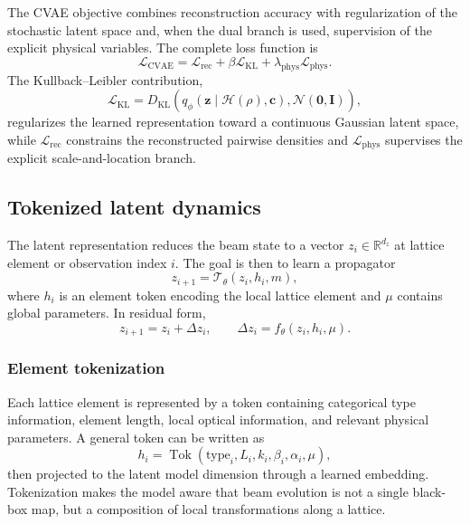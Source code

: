 The CVAE objective combines reconstruction accuracy with regularization of the stochastic latent space and, when the dual branch is used, supervision of the explicit physical variables. The complete loss function is
\[
\mathcal{L}_{\mathrm{CVAE}}
=
\mathcal{L}_{\mathrm{rec}}
+
\beta
\mathcal{L}_{\mathrm{KL}}
+
\lambda_{\mathrm{phys}}
\mathcal{L}_{\mathrm{phys}}.
\]
The Kullback--Leibler contribution,
\[
\mathcal{L}_{\mathrm{KL}}
=
D_{\mathrm{KL}}
\left(
q_{\phi}
\left(
\mathbf{z}
\mid
\mathcal{H}(\rho),\mathbf{c}
\right)
,
\mathcal{N}(\mathbf{0},\mathbf{I})
\right),
\]
regularizes the learned representation toward a continuous Gaussian latent space, while $\mathcal{L}_{\mathrm{rec}}$ constrains the reconstructed pairwise densities and $\mathcal{L}_{\mathrm{phys}}$ supervises the explicit scale-and-location branch.


\subsection{Tokenized latent dynamics}
The latent representation reduces the beam state to a vector $z_i\in\mathbb{R}^{d_z}$ at lattice element or observation index $i$. The goal is then to learn a propagator
\begin{equation}
    z_{i+1}=\mathcal{T}_{\theta}(z_i,h_i,m),
    \label{eq:latent_propagator_revised}
\end{equation}
where $h_i$ is an element token encoding the local lattice element and $\mu$ contains global parameters. In residual form,
\begin{equation}
    z_{i+1}=z_i+\Delta z_i,\qquad \Delta z_i=f_{\theta}(z_i,h_i,\mu).
\end{equation}

\subsubsection{Element tokenization}
Each lattice element is represented by a token containing categorical type information, element length, local optical information, and relevant physical parameters. A general token can be written as
\begin{equation}
    h_i=\operatorname{Tok}(\mathrm{type}_i,L_i,k_i,\beta_i,\alpha_i,\mu),
\end{equation}
then projected to the latent model dimension through a learned embedding. Tokenization makes the model aware that beam evolution is not a single black-box map, but a composition of local transformations along a lattice.


